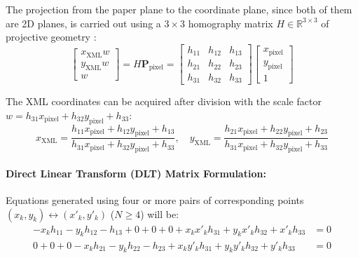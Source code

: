 The projection from the paper plane to the coordinate plane, since both of them are 2D planes, is carried out using a $3 \times 3$ homography matrix $H \in \mathbb{R}^{3 \times 3}$ of projective geometry \cite{LonguetHiggins1985Machine, Pirchheim2011Homography}:
\begin{equation}
\begin{bmatrix}
x_{\text{XML}} w \\
y_{\text{XML}} w \\
w
\end{bmatrix}
=
H \mathbf{P}_{\text{pixel}}
=
\begin{bmatrix}
h_{11} & h_{12} & h_{13} \\
h_{21} & h_{22} & h_{23} \\
h_{31} & h_{32} & h_{33}
\end{bmatrix}
\begin{bmatrix}
x_{\text{pixel}} \\
y_{\text{pixel}} \\
1
\end{bmatrix}
\label{eq:homography_equation_def}
\end{equation}

The XML coordinates can be acquired after division with the scale factor $w = h_{31} x_{\text{pixel}} + h_{32} y_{\text{pixel}} + h_{33}$:
\begin{equation}
x_{\text{XML}} = \frac{h_{11} x_{\text{pixel}} + h_{12} y_{\text{pixel}} + h_{13}}{h_{31} x_{\text{pixel}} + h_{32} y_{\text{pixel}} + h_{33}}, \quad
y_{\text{XML}} = \frac{h_{21} x_{\text{pixel}} + h_{22} y_{\text{pixel}} + h_{23}}{h_{31} x_{\text{pixel}} + h_{32} y_{\text{pixel}} + h_{33}}
\label{eq:homography_cartesian_def}
\end{equation}

\paragraph{Direct Linear Transform (DLT) Matrix Formulation:}
Equations generated using four or more pairs of corresponding points $(x_k, y_k) \leftrightarrow (x'_k, y'_k)$ ($N \ge 4$) will be:
\begin{align}
-x_k h_{11} - y_k h_{12} - h_{13} + 0 + 0 + 0 + x_k x'_k h_{31} + y_k x'_k h_{32} + x'_k h_{33} &= 0 \label{eq:dlt_row1} \\
0 + 0 + 0 - x_k h_{21} - y_k h_{22} - h_{23} + x_k y'_k h_{31} + y_k y'_k h_{32} + y'_k h_{33} &= 0 \label{eq:dlt_row2}
\end{align}

